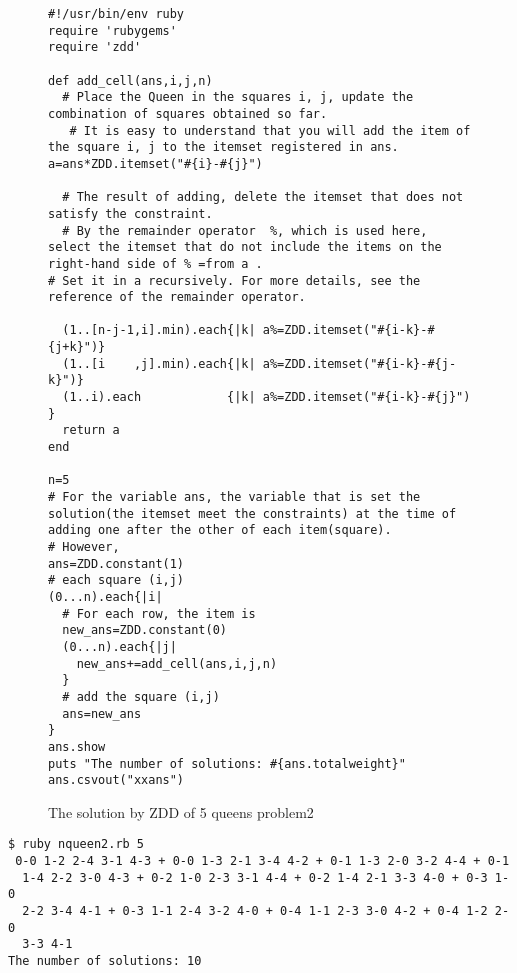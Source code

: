 \begin{figure}[!hbt]
{\small
\begin{Verbatim}[baselinestretch=0.7,frame=single]
#!/usr/bin/env ruby
require 'rubygems'
require 'zdd'

def add_cell(ans,i,j,n)
  # Place the Queen in the squares i, j, update the combination of squares obtained so far.
   # It is easy to understand that you will add the item of the square i, j to the itemset registered in ans. a=ans*ZDD.itemset("#{i}-#{j}")

  # The result of adding, delete the itemset that does not satisfy the constraint.
  # By the remainder operator  %, which is used here, select the itemset that do not include the items on the right-hand side of % =from a .
# Set it in a recursively. For more details, see the reference of the remainder operator.

  (1..[n-j-1,i].min).each{|k| a%=ZDD.itemset("#{i-k}-#{j+k}")}
  (1..[i    ,j].min).each{|k| a%=ZDD.itemset("#{i-k}-#{j-k}")}
  (1..i).each            {|k| a%=ZDD.itemset("#{i-k}-#{j}")  }
  return a
end

n=5
# For the variable ans, the variable that is set the solution(the itemset meet the constraints) at the time of adding one after the other of each item(square).
# However,
ans=ZDD.constant(1)
# each square (i,j)
(0...n).each{|i|
  # For each row, the item is 
  new_ans=ZDD.constant(0)
  (0...n).each{|j|
    new_ans+=add_cell(ans,i,j,n)
  }
  # add the square (i,j)
  ans=new_ans
}
ans.show
puts "The number of solutions: #{ans.totalweight}"
ans.csvout("xxans")
\end{Verbatim}
}
\caption{The solution by ZDD of 5 queens problem2\label{fig:tut_nqueen_scp2}}
\end{figure}

\begin{Verbatim}[baselinestretch=0.7,frame=single]
$ ruby nqueen2.rb 5
 0-0 1-2 2-4 3-1 4-3 + 0-0 1-3 2-1 3-4 4-2 + 0-1 1-3 2-0 3-2 4-4 + 0-1
  1-4 2-2 3-0 4-3 + 0-2 1-0 2-3 3-1 4-4 + 0-2 1-4 2-1 3-3 4-0 + 0-3 1-0
  2-2 3-4 4-1 + 0-3 1-1 2-4 3-2 4-0 + 0-4 1-1 2-3 3-0 4-2 + 0-4 1-2 2-0
  3-3 4-1
The number of solutions: 10
\end{Verbatim}
\fi

%


